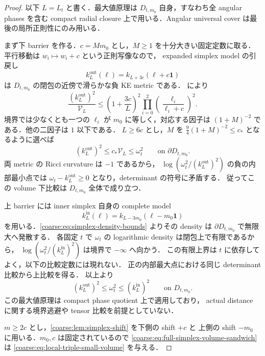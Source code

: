 \begin{proof}
以下 $L=L_t$ と書く．最大値原理は $D_{t,m_0}$ 自身，すなわち全 angular phases を含む
compact radial closure 上で用いる．Angular universal cover は最後の局所正則性にのみ用いる．

まず下 barrier を作る．$c=M m_0$ とし，$M\ge1$ を十分大きい固定定数に取る．
平行移動は $w_i\mapsto w_i+c$ という正則写像なので，
expanded simplex model の引戻し
\[
 k_L^{\mathrm{out}}(\ell)=k_{L+3c}(\ell+c\mathbf1)
\]
は $D_{t,m_0}$ の閉包の近傍で滑らかな負 KE metric である．
 により
\begin{equation}\label{coarse:eq:expanded-simplex-face-ratio}
 \frac{(k_L^{\mathrm{out}})^2}{\mathcal V_L}
 \le\left(1+\frac{3c}{L}\right)^2
       \prod_{i=0}^2\left(\frac{\ell_i}{\ell_i+c}\right)^2.
\end{equation}
境界では少なくとも一つの $\ell_i$ が $m_0$ に等しく，対応する因子は
$(1+M)^{-2}$ である．他の二因子は $1$ 以下である．
$L\ge6c$ とし，$M$ を $\tfrac94(1+M)^{-2}\le c_*$ となるように選べば
\[
 (k_L^{\mathrm{out}})^2\le c_*\mathcal V_L\le\omega_t^2
 \qquad\text{on }\partial D_{t,m_0}.
\]
両 metric の Ricci curvature は $-1$ であるから，
$\log(\omega_t^2/(k_L^{\mathrm{out}})^2)$ の負の内部最小点では
$\omega_t-k_L^{\mathrm{out}}\ge0$ となり，determinant の符号に矛盾する．
従ってこの volume 下比較は $D_{t,m_0}$ 全体で成り立つ．

上 barrier には inner simplex 自身の complete model
\[
 k_L^{\mathrm{in}}(\ell)=k_{L-3m_0}(\ell-m_0\mathbf1)
\]
を用いる．\eqref{coarse:eq:simplex-density-bounds} よりその density は
$\partial D_{t,m_0}$ で無限大へ発散する．
各固定 $t$ で $\omega_t$ の logarithmic density は閉包上で有限であるから，
$\log(\omega_t^2/(k_L^{\mathrm{in}})^2)$ は境界で $-\infty$ へ向かう．
この有限上界は $t$ に依存してよく，以下の比較定数には現れない．
正の内部最大点における同じ determinant 比較から上比較を得る．
以上より
\begin{equation}\label{coarse:eq:full-simplex-volume-sandwich}
 (k_L^{\mathrm{out}})^2\le\omega_t^2\le(k_L^{\mathrm{in}})^2
 \qquad\text{on }D_{t,m_0}.
\end{equation}
この最大値原理は compact phase quotient 上で適用しており，
actual distance に関する境界逃避や tensor 比較を前提としていない．

$m\ge2c$ とし，\cref{coarse:lem:simplex-shift} を下側の shift $+c$ と
上側の shift $-m_0$ に用いる．$m_0,c$ は固定されているので
\eqref{coarse:eq:full-simplex-volume-sandwich} は
\eqref{coarse:eq:local-triple-small-volume} を与える．


\end{proof}
